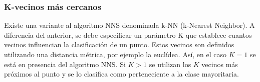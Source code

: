 \documentclass[a4paper,11pt,spanish]{article}
\begin{document}
\subsubsection{K-vecinos más cercanos}
Existe una variante al algoritmo NNS denominada k-NN (k-Nearest Neighbor). A diferencia del anterior, se debe especificar un parámetro K que establece cuantos vecinos influencian la clasificación de un punto. 
Estos vecinos son definidos utilizando una distancia métrica, por ejemplo la euclídea. 
Así, en el caso $K=1$ se está en presencia del algoritmo NNS. 
Si $K>1$ se utilizan los $K$ vecinos m\'as pr\'oximos al punto y se lo clasifica como perteneciente a la clase mayoritaria. 


% 


\end{document}
